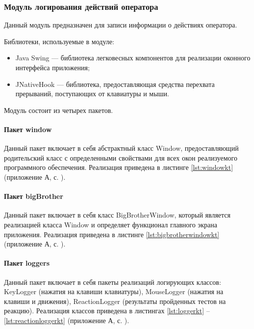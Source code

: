 \subsubsection{Модуль логирования действий оператора}
Данный модуль предназначен для записи информации о действиях оператора.

Библиотеки, используемые в модуле:

\begin{itemize}[leftmargin=1.6\parindent]
	\item Java Swing \cite{swing} --- библиотека легковесных компонентов для реализации оконного интерфейса приложения;
	\item JNativeHook \cite{jnativehook} --- библиотека, предоставляющая средства перехвата прерываний, поступающих от клавиатуры и мыши.
\end{itemize}

Модуль состоит из четырех пакетов.

\paragraph{Пакет window \newline}
Данный пакет включает в себя абстрактный класс Window, предоставляющий родительский класс с определенными свойствами для всех окон реализуемого программного обеспечения. Реализация приведена в листинге \ref{lst:windowkt} (приложение А, с. \pageref{chp:application-a}).

\paragraph{Пакет bigBrother \newline}
Данный пакет включает в себя класс BigBrotherWindow, который является реализацией класса Window и определяет функционал главного экрана приложения. Реализация приведена в листинге \ref{lst:bigbrotherwindowkt} (приложение А, с. \pageref{chp:application-a}).

\paragraph{Пакет loggers \newline}
Данный пакет включает в себя пакеты реализаций логирующих классов: Key\-Logger (нажатия на клавиши клавиатуры), MouseLogger (нажатия на клавиши и движения), ReactionLogger (результаты пройденных тестов на реакцию). Реализация классов приведена в листингах \ref{lst:loggerkt} -- \ref{lst:reactionloggerkt} (приложение А, с. \pageref{chp:application-a}).


